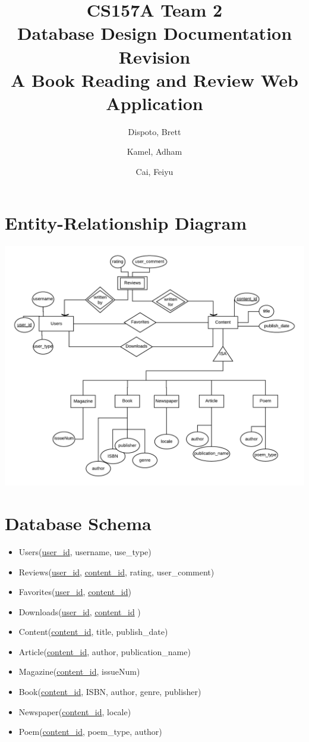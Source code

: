 \documentclass[letter, 12pt, titlepage]{article}
\author{
	Dispoto, Brett\\
        \and
        Kamel, Adham\\
        \and
        Cai, Feiyu\\
}
\title{CS157A Team 2 \\ Database Design Documentation Revision \\
        \large A Book Reading and Review Web Application}
\begin{document}
  \maketitle
  	\section{Entity-Relationship Diagram}
	\includegraphics[scale=1]{erd-rev.png}
	\section{Database Schema}
		\begin{itemize}
			\item Users(\underline{user\_id}, username, use\_type)
			\item Reviews(\underline{user\_id}, \underline{content\_id}, rating, user\_comment)
			\item Favorites(\underline{user\_id}, \underline{content\_id})
			\item Downloads(\underline{user\_id}, \underline{content\_id} )
			\item Content(\underline{content\_id}, title, publish\_date)
			\item Article(\underline{content\_id}, author, publication\_name)
			\item Magazine(\underline{content\_id}, issueNum)
			\item Book(\underline{content\_id}, ISBN, author, genre, publisher)
			\item Newspaper(\underline{content\_id}, locale)
			\item Poem(\underline{content\_id}, poem\_type, author)
		\end{itemize}
\end{document}
